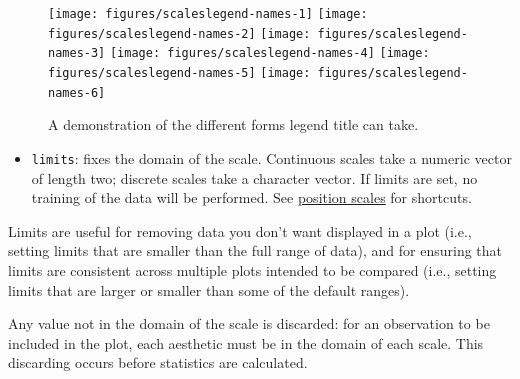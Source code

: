 \begin{Shaded}
\begin{Highlighting}[]
\StringTok{ }  
\StringTok{ }\NormalTok{(}\NormalTok{)}
\StringTok{ }\NormalTok{(}\NormalTok{)}
\StringTok{ }\NormalTok{(}\NormalTok{)}
\StringTok{ }\NormalTok{(} \NormalTok{, } \NormalTok{, } \NormalTok{)}
\StringTok{ }\NormalTok{(}\NormalTok{(}
\end{Highlighting}
\end{Shaded}

\begin{figure}
\texttt{[image: figures/scaleslegend-names-1]} \texttt{[image: figures/scaleslegend-names-2]} \texttt{[image: figures/scaleslegend-names-3]} \texttt{[image: figures/scaleslegend-names-4]} \texttt{[image: figures/scaleslegend-names-5]} \texttt{[image: figures/scaleslegend-names-6]} \caption{A demonstration of the different forms legend title can take.\label{fig:legend-names}}
\end{figure}

\begin{itemize}
\itemsep1pt\parskip0pt
\item
  \texttt{limits}: fixes the domain of the scale. Continuous scales take
  a numeric vector of length two; discrete scales take a character
  vector. If limits are set, no training of the data will be performed.
  See \hyperref[sub:scale-position]{position scales} for shortcuts.
   
\end{itemize}

Limits are useful for removing data you don't want displayed in a plot
(i.e., setting limits that are smaller than the full range of data), and
for ensuring that limits are consistent across multiple plots intended
to be compared (i.e., setting limits that are larger or smaller than
some of the default ranges).

Any value not in the domain of the scale is discarded: for an
observation to be included in the plot, each aesthetic must be in the
domain of each scale. This discarding occurs before statistics are
calculated.


